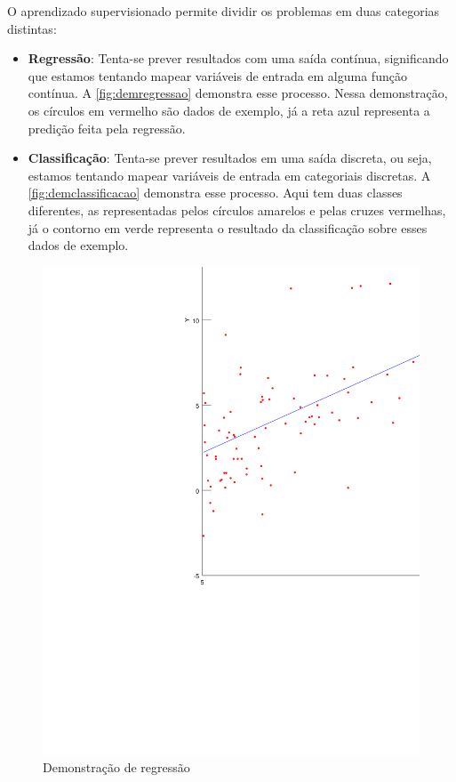 O aprendizado supervisionado permite dividir os problemas em duas categorias distintas:


\begin{itemize}
	\item \textbf{Regressão}: Tenta-se prever resultados com uma saída contínua, significando que estamos tentando mapear variáveis de entrada em alguma função contínua. A \autoref{fig:demregressao} demonstra esse processo. Nessa demonstração, os círculos em vermelho são dados de exemplo, já a reta azul representa a predição feita pela regressão.
	\item \textbf{Classificação}:  Tenta-se prever resultados em uma saída discreta, ou seja, estamos tentando mapear variáveis de entrada em categoriais discretas. A \autoref{fig:demclassificacao} demonstra esse processo. Aqui tem duas classes diferentes, as representadas pelos círculos amarelos e pelas cruzes vermelhas, já o contorno em verde representa o resultado da classificação sobre esses dados de exemplo.
\end{itemize}


\begin{figure}[htb]
	  \caption{Demonstração de regressão}\label{fig:demregressao}
	  \begin{center}
	      \includegraphics[scale=0.55]{img/regressao2}
	  \end{center}
\end{figure}

